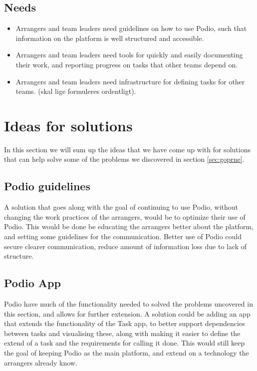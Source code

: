 \subsection{Needs}
\label{subsec:needs}
\begin{itemize}
    \item Arrangers and team leaders need guidelines on how to use Podio, such that information on the platform is well structured and accessible.
    \item Arrangers and team leaders need tools for quickly and easily documenting their work, and reporting progress on tasks that other teams depend on.
    \item Arrangers and team leaders need infrastructure for defining tasks for other teams. (skal lige formuleres ordentligt).
\end{itemize}

\section{Ideas for solutions}
\label{sec:ideas}
In this section we will sum up the ideas that we have come up with for solutions
that can help solve some of the problems we discovered in section \ref{sec:goprne}.

\subsection{Podio guidelines}
A solution that goes along with the goal of continuing to use Podio, without changing the work practices of the arrangers, would be to optimize their use of Podio. This would be done be educating the arrangers better about the platform, and setting some guidelines for the communication. Better use of Podio could secure clearer communication, reduce amount of information loss due to lack of structure.

\subsection{Podio App}
Podio have much of the functionality needed to solved the problems uncovered in this section, and allows for further extension. A solution could be adding an app that extends the functionality of the Task app, to better support dependencies between tasks and visualising these, along with making it easier to define the extend of a task and the requirements for calling it done. This would still keep the goal of keeping Podio as the main platform, and extend on a technology the arrangers already know.

